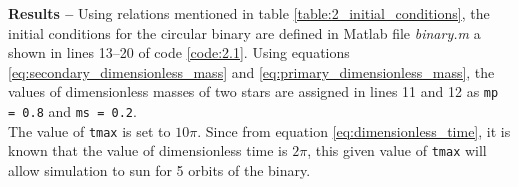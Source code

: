 \documentclass[a4paper]{article}
\begin{document}
\begin{enumerate} [label*=\textbf{(\alph*)}]
				\subitem \textbf{Results  --}
				Using relations mentioned in table \ref{table:2_initial_conditions}, the initial conditions for the circular binary are defined in Matlab file \textit{binary.m} a shown in lines 13--20 of code \ref{code:2.1}. Using equations \ref{eq:secondary_dimensionless_mass} and \ref{eq:primary_dimensionless_mass}, the values of dimensionless masses of two stars are assigned in lines 11 and 12 as \texttt{mp = 0.8} and \texttt{ms = 0.2}.\\				
				The value of \texttt{tmax} is set to \(10\pi\). Since from equation \ref{eq:dimensionless_time}, it is known that the value of dimensionless time is \(2\pi\), this given value of \texttt{tmax} will allow simulation to sun for 5 orbits of the binary. 
				
				\begin{figure} [h] 
					
				\end{figure}
				
			

\end{enumerate}
\end{document}
